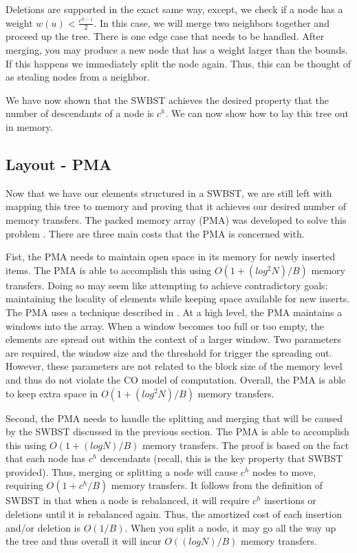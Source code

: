 \documentclass{style}
\begin{document}
Deletions are supported in the exact same way, except, we check if a node has
a weight $w(u) < \frac{c^{h-1}}{2}$. In this case, we will merge two neighbors
together and proceed up the tree. There is one edge case that needs to be
handled. After merging, you may produce a new node that has a weight larger
than the bounds. If this happens we immediately split the node again. Thus,
this can be thought of as stealing nodes from a neighbor.

We have now shown that the SWBST achieves the desired property that the number
of descendants of a node is $c^h$. We can now show how to lay this tree out in
memory.

\subsection{Layout - PMA}
\label{sec:layout}


Now that we have our elements structured in a SWBST, we are still left with
mapping this tree to memory and proving that it achieves our desired number of
memory transfers. The packed memory array (PMA) was developed to solve this
problem \cite{BenderDemainColton}. There are three main costs that the PMA is concerned with.

Fist, the PMA needs to maintain open space in its memory for newly inserted
items. The PMA is able to accomplish this using $O(1 + (log^2 N) / B)$ memory
transfers. Doing so may seem like attempting to achieve contradictory goals:
maintaining the locality of elements while keeping space available for new
inserts. The PMA uses a technique described in \cite{packedmemoryarray}. At a high level, the PMA
maintains a windows into the array. When a window becomes too full or too
empty, the elements are spread out within the context of a larger window. Two
parameters are required, the window size and the threshold for trigger the
spreading out. However, these parameters are not related to the block size of
the memory level and thus do not violate the CO model of computation. Overall,
the PMA is able to keep extra space in $O(1 + (log^2 N) / B)$ memory
transfers.

Second, the PMA needs to handle the splitting and merging that will be caused
by the SWBST discussed in the previous section. The PMA is able to accomplish
this using $O(1 + (log N) /B)$ memory transfers. The proof is based on the
fact that each node has $c^h$ descendants (recall, this is the key property
that SWBST provided). Thus, merging or splitting a node will cause $c^h$ nodes
to move, requiring $O(1 + c^h/B)$ memory transfers. It follows from the
definition of SWBST in \cite{swbst} that when a node is rebalanced, it will require
$c^h$ insertions or deletions until it is rebalanced again. Thus, the
amortized cost of each insertion and/or deletion is $O(1/B)$. When you split a
node, it may go all the way up the tree and thus overall it will incur $O((log
N) / B)$ memory transfers.
\end{document}
